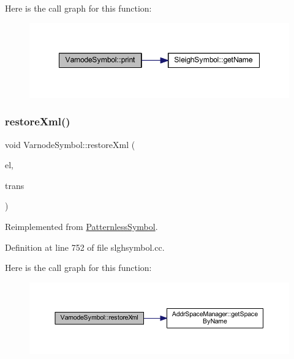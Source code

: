 Here is the call graph for this function\+:
\nopagebreak
\begin{figure}[H]
\begin{center}
\leavevmode
\includegraphics[width=348pt]{class_varnode_symbol_a10b765544964a8f2b84072676fc945ff_cgraph}
\end{center}
\end{figure}
\mbox{\label{class_varnode_symbol_a9d0f7e98d0425e26ca4eddf002f1e471}} 
\subsubsection{\texorpdfstring{restoreXml()}{restoreXml()}}
{\footnotesize\ttfamily void Varnode\+Symbol\+::restore\+Xml (\begin{DoxyParamCaption}\item[{const \mbox{\hyperlink{class_element}{Element}} $\ast$}]{el,  }\item[{\mbox{\hyperlink{class_sleigh_base}{Sleigh\+Base}} $\ast$}]{trans }\end{DoxyParamCaption})\hspace{0.3cm}{\ttfamily [virtual]}}



Reimplemented from \mbox{\hyperlink{class_patternless_symbol_ab81f5522c0e65c2fe464d4bb62193948}{Patternless\+Symbol}}.



Definition at line 752 of file slghsymbol.\+cc.

Here is the call graph for this function\+:
\nopagebreak
\begin{figure}[H]
\begin{center}
\leavevmode
\includegraphics[width=350pt]{class_varnode_symbol_a9d0f7e98d0425e26ca4eddf002f1e471_cgraph}
\end{center}
\end{figure}
\mbox{\label{class_varnode_symbol_aed153df5b4c3fdb8c04bf422e2ea329b}} 
